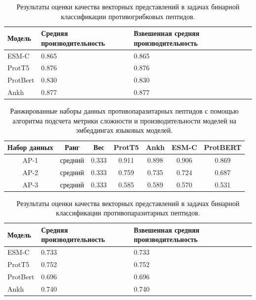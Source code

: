 \documentclass[specification,annotation,times]{itmo-student-thesis}
\begin{document}
\begin{table}[h]
\centering

\caption{Результаты оценки качества векторных представлений в задачах бинарной классификации противогрибковых пептидов.}
\label{tab:compare_results_af}
\begin{tabular}{|p{3cm}|p{5cm}|p{5cm}|}
\hline
Модель & Средняя \newline производительность & Взвешенная \newline средняя \newline производительность \\
\hline
ESM-C & 0.865 & 0.865 \\ \hline
ProtT5 & 0.876 & 0.876 \\ \hline
ProtBert & 0.830 & 0.830 \\ \hline
Ankh & 0.877 & 0.877 \\ \hline
\end{tabular}

\end{table}

\begin{table}[h]
\centering
\caption{Ранжированные наборы данных противопаразитарных пептидов с помощью алгоритма подсчета метрики сложности и производительности моделей на эмбеддингах языковых моделей.}
\label{tab:model_performance_ap}

\begin{tabular}{|c|c|c|c|c|c|c|}
\hline
Набор данных & Ранг & Вес & ProtT5 & Ankh & ESM-C & ProtBERT \\
\hline
AP-1 & средний & 0.333 & 0.911 & 0.898 & 0.906 & 0.869 \\ \hline
AP-2 & средний & 0.333 & 0.759 & 0.735 & 0.724 & 0.687 \\ \hline
AP-3 & средний & 0.333 & 0.585 & 0.589 & 0.570 & 0.531 \\ \hline
\end{tabular}

\end{table}


\begin{table}[h]
\centering

\caption{Результаты оценки качества векторных представлений в задачах бинарной классификации противопаразитарных пептидов.}
\label{tab:compare_results_ap}
\begin{tabular}{|p{3cm}|p{5cm}|p{5cm}|}
\hline
Модель & Средняя \newline производительность & Взвешенная \newline средняя \newline производительность \\
\hline
ESM-C & 0.733 & 0.733 \\ \hline
ProtT5 & 0.752 & 0.752 \\ \hline
ProtBert & 0.696 & 0.696 \\ \hline
Ankh & 0.740 & 0.740 \\ \hline
\end{tabular}

\end{table}
\end{document}

